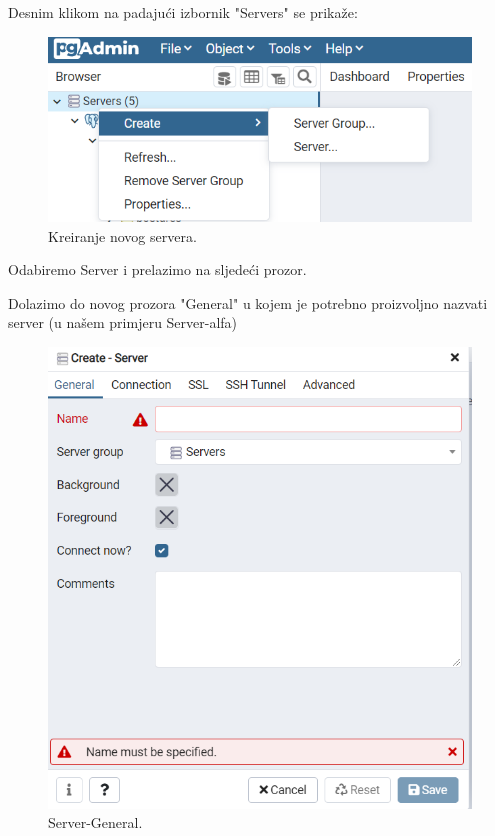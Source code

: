 			 Desnim klikom na padajući izbornik "Servers" se prikaže:
			 
			 \begin{figure}[H]
			 	\includegraphics[scale=1]{slike/novi server.png} 
			 	\centering
			 	\caption{ Kreiranje novog servera.}
			 	\label{DS}
			 \end{figure}
		 	
		 	 Odabiremo Server i prelazimo na sljedeći prozor.
			 
			 Dolazimo do novog prozora "General" u kojem je potrebno proizvoljno nazvati server (u našem primjeru Server-alfa)
			 \begin{figure}[H]
			 	\includegraphics[scale=1]{slike/server general.png} 
			 	\centering
			 	\caption{ Server-General.}
			 	\label{DS}
			 \end{figure}
			 
